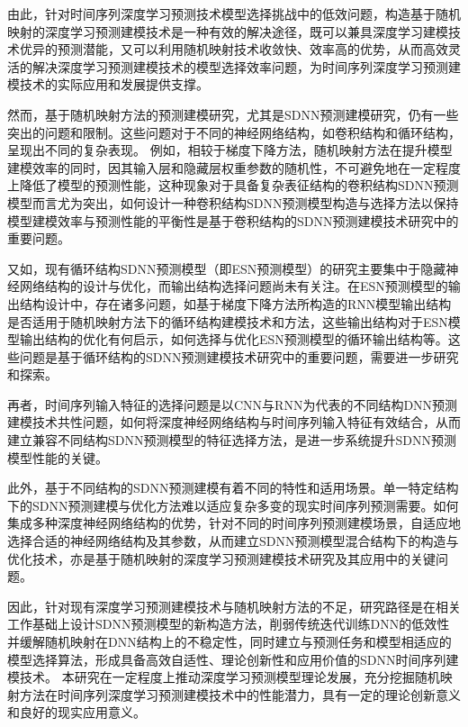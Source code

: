 由此，针对时间序列深度学习预测技术模型选择挑战中的低效问题，构造基于随机映射的深度学习预测建模技术是一种有效的解决途径，既可以兼具深度学习建模技术优异的预测潜能，又可以利用随机映射技术收敛快、效率高的优势，从而高效灵活的解决深度学习预测建模技术的模型选择效率问题，为时间序列深度学习预测建模技术的实际应用和发展提供支撑。

然而，基于随机映射方法的预测建模研究，尤其是SDNN预测建模研究，仍有一些突出的问题和限制。这些问题对于不同的神经网络结构，如卷积结构和循环结构，呈现出不同的复杂表现。
例如，相较于梯度下降方法，随机映射方法在提升模型建模效率的同时，因其输入层和隐藏层权重参数的随机性，不可避免地在一定程度上降低了模型的预测性能，这种现象对于具备复杂表征结构的卷积结构SDNN预测模型而言尤为突出，如何设计一种卷积结构SDNN预测模型构造与选择方法以保持模型建模效率与预测性能的平衡性是基于卷积结构的SDNN预测建模技术研究中的重要问题。

又如，现有循环结构SDNN预测模型（即ESN预测模型）的研究主要集中于隐藏神经网络结构的设计与优化\cite{liPSObased2019,chouikhiPSObased2017}，而输出结构选择问题尚未有关注。在ESN预测模型的输出结构设计中，存在诸多问题，如基于梯度下降方法所构造的RNN模型输出结构是否适用于随机映射方法下的循环结构建模技术和方法，这些输出结构对于ESN模型输出结构的优化有何启示，如何选择与优化ESN预测模型的循环输出结构等。这些问题是基于循环结构的SDNN预测建模技术研究中的重要问题，需要进一步研究和探索。

再者，时间序列输入特征的选择问题是以CNN与RNN为代表的不同结构DNN预测建模技术共性问题，如何将深度神经网络结构与时间序列输入特征有效结合，从而建立兼容不同结构SDNN预测模型的特征选择方法，是进一步系统提升SDNN预测模型性能的关键。

此外，基于不同结构的SDNN预测建模有着不同的特性和适用场景。单一特定结构下的SDNN预测建模与优化方法难以适应复杂多变的现实时间序列预测需要。如何集成多种深度神经网络结构的优势，针对不同的时间序列预测建模场景，自适应地选择合适的神经网络结构及其参数，从而建立SDNN预测模型混合结构下的构造与优化技术，亦是基于随机映射的深度学习预测建模技术研究及其应用中的关键问题。

因此，针对现有深度学习预测建模技术与随机映射方法的不足，研究路径是在相关工作基础上设计SDNN预测模型的新构造方法，削弱传统迭代训练DNN的低效性并缓解随机映射在DNN结构上的不稳定性，同时建立与预测任务和模型相适应的模型选择算法，形成具备高效自适性、理论创新性和应用价值的SDNN时间序列建模技术。
本研究在一定程度上推动深度学习预测模型理论发展，充分挖掘随机映射方法在时间序列深度学习预测建模技术中的性能潜力，具有一定的理论创新意义和良好的现实应用意义。
